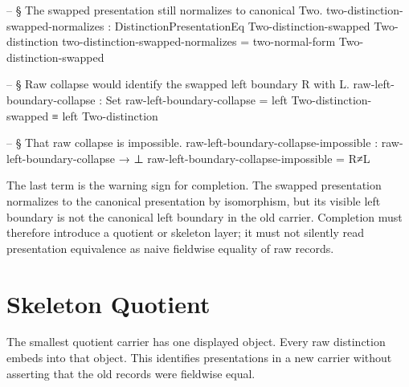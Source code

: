 \documentclass[11pt]{article}
\begin{document}
\begin{code}
-- § The swapped presentation still normalizes to canonical Two.
two-distinction-swapped-normalizes :
  DistinctionPresentationEq Two-distinction-swapped Two-distinction
two-distinction-swapped-normalizes = two-normal-form Two-distinction-swapped

-- § Raw collapse would identify the swapped left boundary R with L.
raw-left-boundary-collapse : Set
raw-left-boundary-collapse = left Two-distinction-swapped ≡ left Two-distinction

-- § That raw collapse is impossible.
raw-left-boundary-collapse-impossible : raw-left-boundary-collapse → ⊥
raw-left-boundary-collapse-impossible = R≠L
\end{code}

The last term is the warning sign for completion.  The swapped
presentation normalizes to the canonical presentation by isomorphism,
but its visible left boundary is not the canonical left boundary in the
old carrier.  Completion must therefore introduce a quotient or
skeleton layer; it must not silently read presentation equivalence as
naive fieldwise equality of raw records.

\section{Skeleton Quotient}

The smallest quotient carrier has one displayed object.  Every raw
distinction embeds into that object.  This identifies presentations in a
new carrier without asserting that the old records were fieldwise equal.
\end{document}
